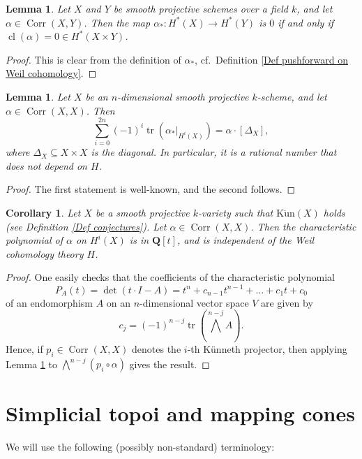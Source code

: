 \documentclass[11pt]{amsart}
\newtheorem{Lemma}[Thm]{Lemma}
\newtheorem{Cor}[Thm]{Corollary}
\theoremstyle{definition}
\newcommand{\Q}{\mathbf Q}
\newcommand{\cl}{\operatorname{cl}}
\newcommand{\Corr}{\operatorname{Corr}}
\newcommand{\tr}{\operatorname{tr}}
\newcommand{\Kun}{\operatorname{K\ddot un}}
\begin{document}
\begin{Lemma}\label{Lem vanish}
Let $X$ and $Y$ be smooth projective schemes over a field $k$, and
let $\alpha \in \Corr(X,Y)$. Then the map $\alpha_* \colon H^*(X)
\to H^*(Y)$ is $0$ if and only if $\cl(\alpha) = 0 \in H^*(X \times
Y)$.
\end{Lemma}

\begin{proof}
This is clear from the definition of $\alpha_*$, cf.\ Definition
\ref{Def pushforward on Weil cohomology}.
\end{proof}

\begin{Lemma}\label{Lem trace}
Let $X$ be an $n$-dimensional smooth projective $k$-scheme, and let
$\alpha \in \Corr(X,X)$. Then
\[
\sum_{i = 0}^{2n} (-1)^i \tr\left(\alpha_*\big|_{H^i(X)}\right) =
\alpha \cdot [\Delta_X],
\]
where $\Delta_X \subseteq X \times X$ is the diagonal. In particular, it is a rational number that does not depend on $H$. %
\end{Lemma}

\begin{proof}
The first statement is well-known, and the second follows.
\end{proof}

\begin{Cor}\label{Cor characteristic polynomial}
Let $X$ be a smooth projective $k$-variety such that $\Kun(X)$ holds
(see Definition \ref{Def conjectures}). Let $\alpha \in \Corr(X,X)$.
Then the characteristic polynomial of $\alpha$ on $H^i(X)$ is in
$\Q[t]$, and is independent of the Weil cohomology theory $H$.
\end{Cor}

\begin{proof}
One easily checks that the coefficients of the characteristic
polynomial
$$P_A(t) = \det(t \cdot I - A) = t^n + c_{n-1}t^{n-1} +\ldots + c_1 t + c_0$$
of an endomorphism $A$ on an $n$-dimensional
vector space $V$ are given by
\[
c_j = (-1)^{n-j}\tr\left({\textstyle\bigwedge}^{n-j}A\right).
\]
Hence, if $p_i \in \Corr(X,X)$ denotes the $i$-th K\"unneth
projector, then applying Lemma \ref{Lem trace} to
$\bigwedge^{n-j}(p_i \circ \alpha)$ gives the result.
\end{proof}








\section{Simplicial topoi and mapping cones}\label{Sec simplicial}
We will use the following (possibly non-standard) terminology:
\end{document}
